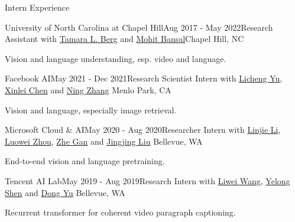\documentclass{resume} %
\begin{document}
\begin{rSection}{Intern Experience}

\begin{rSubsection}{University of North Carolina at Chapel Hill}{Aug 2017 - May 2022}{Research Assistant with \href{http://www.tamaraberg.com/}{Tamara L. Berg} and \href{http://www.cs.unc.edu/~mbansal/}{Mohit Bansal}}{Chapel Hill, NC}
\item Vision and language understanding, esp. video and language.
\end{rSubsection}




\begin{rSubsection}{Facebook AI}{May 2021 - Dec 2021}{Research Scientist Intern with 
    \href{https://lichengunc.github.io/}{Licheng Yu},
    \href{http://xinleic.xyz/}{Xinlei Chen} and \href{https://scholar.google.com/citations?user=DplAah0AAAAJ&hl=en}{Ning Zhang}} {Menlo Park, CA}
    \item Vision and language, especially image retrieval.
    \end{rSubsection}



\begin{rSubsection}{Microsoft Cloud \& AI}{May 2020 - Aug 2020}{Researcher Intern with 
    \href{https://scholar.google.com/citations?user=WR875gYAAAAJ&hl=en}{Linjie Li},
    \href{https://luoweizhou.github.io/}{Luowei Zhou}, \href{http://zhegan27.github.io/}{Zhe Gan} and
    \href{https://www.linkedin.com/in/jingjing-liu-65703431/}{Jingjing Liu}} {Bellevue, WA}
    \item End-to-end vision and language pretraining.
    \end{rSubsection}



\begin{rSubsection}{Tencent AI Lab}{May 2019 - Aug 2019}{Research Intern with 
    \href{http://www.deepcv.net/}{Liwei Wang}, 
    \href{https://scholar.google.com/citations?hl=en&user=S6OFEFEAAAAJ}{Yelong Shen} 
    and \href{https://scholar.google.com/citations?user=tMY31_gAAAAJ&hl=en}{Dong Yu}} {Bellevue, WA}
    \item Recurrent transformer for coherent video paragraph captioning.
    \end{rSubsection}



\end{rSection}
\end{document}
